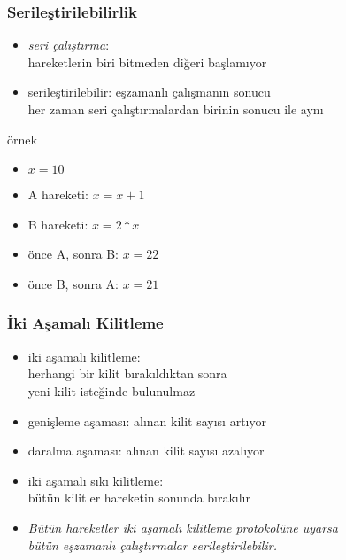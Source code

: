 \documentclass[dvipsnames]{beamer}
\theoremstyle{plain}
\begin{document}
\begin{frame}
  \frametitle{Serileştirilebilirlik}

  \begin{itemize}
    \item \emph{seri çalıştırma}:\\
      hareketlerin biri bitmeden diğeri başlamıyor

    \pause
    \item \alert{serileştirilebilir}: eşzamanlı çalışmanın sonucu\\
      her zaman seri çalıştırmalardan birinin sonucu ile aynı
  \end{itemize}

  \pause
  \begin{exampleblock}{örnek}
    \begin{itemize}
      \item $x = 10$
      \item A hareketi: $x = x + 1$
      \item B hareketi: $x = 2 * x$

      \pause
      \medskip
      \item önce A, sonra B: $x = 22$
      \item önce B, sonra A: $x = 21$
    \end{itemize}
  \end{exampleblock}  
\end{frame}

\begin{frame}
  \frametitle{İki Aşamalı Kilitleme}

  \begin{itemize}
    \item \alert{iki aşamalı kilitleme}:\\
      herhangi bir kilit bırakıldıktan sonra\\
      yeni kilit isteğinde bulunulmaz
      \item genişleme aşaması: alınan kilit sayısı artıyor
      \item daralma aşaması: alınan kilit sayısı azalıyor

      \medskip
      \item \alert{iki aşamalı sıkı kilitleme}:\\
        bütün kilitler hareketin sonunda bırakılır

      \pause
      \medskip
      \item \emph{Bütün hareketler iki aşamalı kilitleme protokolüne uyarsa\\
      bütün eşzamanlı çalıştırmalar serileştirilebilir.}
  \end{itemize}
\end{frame}
\end{document}
